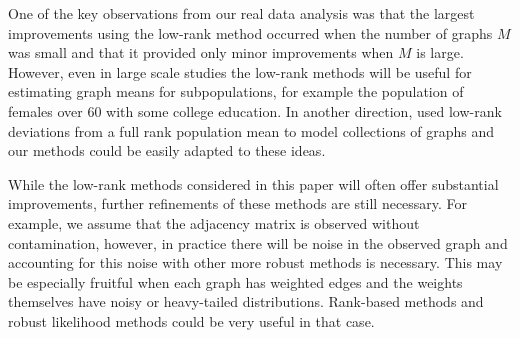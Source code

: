 \documentclass[a4paper]{article}
\begin{document}
One of the key observations from our real data analysis was that the largest improvements using the low-rank method occurred when the number of graphs $M$ was small and that it provided only minor improvements when $M$ is large. 
However, even in large scale studies the low-rank methods will be useful for estimating graph means for subpopulations, for example the population of females over 60 with some college education.
In another direction, \citet{durante2014nonparametric} used low-rank deviations from a full rank population mean to model collections of graphs and our methods could be easily adapted to these ideas.




While the low-rank methods considered in this paper will often offer substantial improvements, further refinements of these methods are still necessary.
For example, we assume that the adjacency matrix is observed without contamination, however, in practice there will be noise in the observed graph and accounting for this noise with other more robust methods is necessary.
This may be especially fruitful when each graph has weighted edges and the weights themselves have noisy or heavy-tailed distributions.
Rank-based methods and robust likelihood methods could be very useful in that case. 

\end{document}
